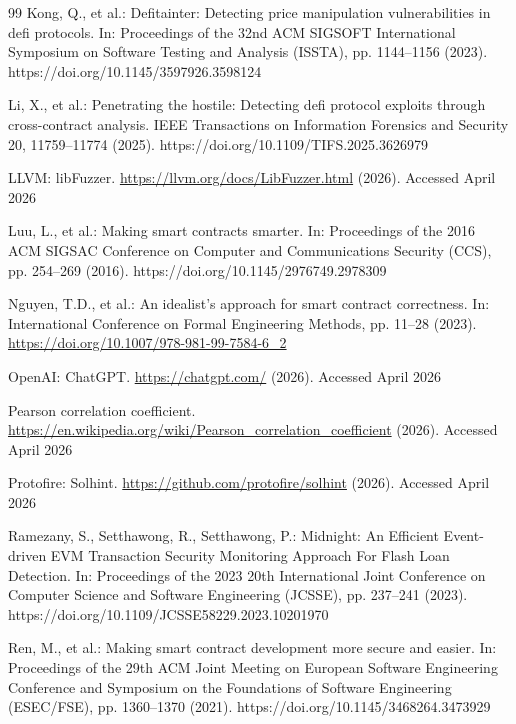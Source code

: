 \documentclass[pdflatex,sn-basic]{sn-jnl}%
\theoremstyle{thmstyleone}%
\theoremstyle{thmstyletwo}%
\theoremstyle{thmstylethree}%
\begin{document}
\begin{thebibliography}{99}
Kong, Q., et al.: Defitainter: Detecting price manipulation vulnerabilities in defi protocols. In: Proceedings of the 32nd ACM SIGSOFT International Symposium on Software Testing and Analysis (ISSTA), pp. 1144--1156 (2023). https://doi.org/10.1145/3597926.3598124

Li, X., et al.: Penetrating the hostile: Detecting defi protocol exploits through cross-contract analysis. IEEE Transactions on Information Forensics and Security 20, 11759--11774 (2025). https://doi.org/10.1109/TIFS.2025.3626979

LLVM: libFuzzer. \url{https://llvm.org/docs/LibFuzzer.html} (2026). Accessed April 2026

Luu, L., et al.: Making smart contracts smarter. In: Proceedings of the 2016 ACM SIGSAC Conference on Computer and Communications Security (CCS), pp. 254--269 (2016). https://doi.org/10.1145/2976749.2978309

Nguyen, T.D., et al.: An idealist's approach for smart contract correctness. In: International Conference on Formal Engineering Methods, pp. 11--28 (2023). \url{https://doi.org/10.1007/978-981-99-7584-6_2}

OpenAI: ChatGPT. \url{https://chatgpt.com/} (2026). Accessed April 2026

Pearson correlation coefficient. \url{https://en.wikipedia.org/wiki/Pearson_correlation_coefficient} (2026). Accessed April 2026

Protofire: Solhint. \url{https://github.com/protofire/solhint} (2026). Accessed April 2026

Ramezany, S., Setthawong, R., Setthawong, P.: Midnight: An Efficient Event-driven EVM Transaction Security Monitoring Approach For Flash Loan Detection. In: Proceedings of the 2023 20th International Joint Conference on Computer Science and Software Engineering (JCSSE), pp. 237--241 (2023). https://doi.org/10.1109/JCSSE58229.2023.10201970

Ren, M., et al.: Making smart contract development more secure and easier. In: Proceedings of the 29th ACM Joint Meeting on European Software Engineering Conference and Symposium on the Foundations of Software Engineering (ESEC/FSE), pp. 1360--1370 (2021). https://doi.org/10.1145/3468264.3473929


\end{thebibliography}
\end{document}
